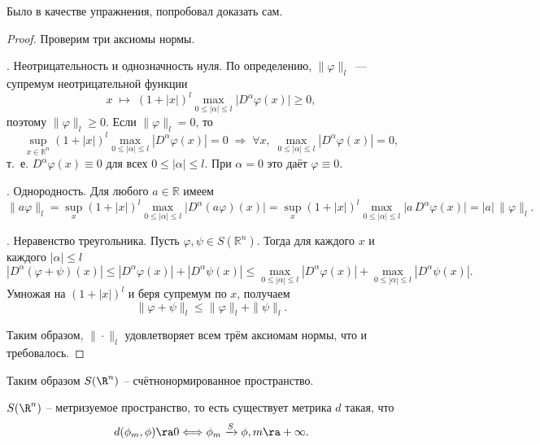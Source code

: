 \begin{note}
Было в качестве упражнения, попробовал доказать сам.
\end{note}

\begin{proof}
Проверим три аксиомы нормы.

\medskip
{}. Неотрицательность и однозначность нуля.
По определению, \(\|\varphi\|_l\)~--- супремум неотрицательной функции
\[
x\;\mapsto\;(1+|x|)^l \max_{0 \le |\alpha|\le l}\bigl|D^\alpha\varphi(x)\bigr|\ge0,
\]
поэтому \(\|\varphi\|_l\ge0\). Если \(\|\varphi\|_l=0\), то
\[
\sup_{x\in\mathbb{R}^n}(1+|x|)^l\max_{0 \le |\alpha|\le l}|D^\alpha\varphi(x)|=0
\;\Longrightarrow\;
\forall x,\;\max_{0 \le |\alpha|\le l}|D^\alpha\varphi(x)|=0,
\]
т.~е. \(D^\alpha\varphi(x)\equiv0\) для всех \(0 \le |\alpha|\le l\). При \(\alpha=0\) это даёт \(\varphi\equiv0\).

\medskip
{}. Однородность.
Для любого \(a\in\mathbb{R}\) имеем
\[
\|a\varphi\|_l
=\sup_x(1+|x|)^l\max_{0 \le |\alpha|\le l}\bigl|D^\alpha(a\varphi)(x)\bigr|
=\sup_x(1+|x|)^l\max_{0 \le |\alpha|\le l}\bigl|a\,D^\alpha\varphi(x)\bigr|
=|a|\,\|\varphi\|_l.
\]

\medskip
{}. Неравенство треугольника.
Пусть \(\varphi,\psi\in S(\mathbb{R}^n)\). Тогда для каждого \(x\) и каждого \(|\alpha|\le l\)
\[
|D^\alpha(\varphi+\psi)(x)|
\le|D^\alpha\varphi(x)|+|D^\alpha\psi(x)|
\le\max_{0 \le |\alpha|\le l}|D^\alpha\varphi(x)|+\max_{0 \le |\alpha|\le l}|D^\alpha\psi(x)|.
\]
Умножая на \((1+|x|)^l\) и беря супремум по \(x\), получаем
\[
\|\varphi+\psi\|_l
\le\|\varphi\|_l+\|\psi\|_l.
\]

Таким образом, \(\|\cdot\|_l\) удовлетворяет всем трём аксиомам нормы, что и требовалось.
\end{proof}
\begin{note}
    Таким образом $S(\R^n)$ -- счётнонормированное пространство.
\end{note}
\begin{theorem}
    $S(\R^n)$ -- метризуемое пространство, то есть существует метрика $d$ такая, что \[d(\phi_m, \phi) \ra 0 \Longleftrightarrow \phi_m \xrightarrow{S} \phi, m \ra +\infty.\]
\end{theorem}

